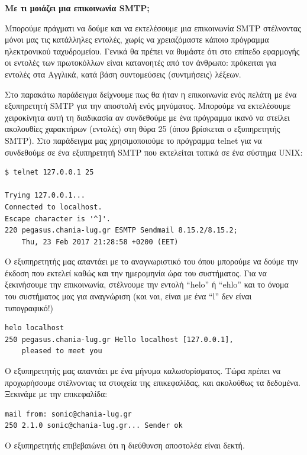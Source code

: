 \begin{inthebox}
\textbf{Με τι μοιάζει μια επικοινωνία SMTP;}

Μπορούμε πράγματι να δούμε και να εκτελέσουμε μια επικοινωνία SMTP στέλνοντας μόνοι μας τις κατάλληλες εντολές, χωρίς να χρειαζόμαστε κάποιο πρόγραμμα ηλεκτρονικού ταχυδρομείου. Γενικά θα πρέπει να θυμάστε ότι στο επίπεδο εφαρμογής οι εντολές των πρωτοκόλλων είναι κατανοητές από τον άνθρωπο: πρόκειται για εντολές στα Αγγλικά, κατά βάση συντομεύσεις (συντμήσεις) λέξεων.

Στο παρακάτω παράδειγμα δείχνουμε πως θα ήταν η επικοινωνία ενός πελάτη με ένα εξυπηρετητή SMTP για την αποστολή ενός μηνύματος. Μπορούμε να εκτελέσουμε χειροκίνητα αυτή τη διαδικασία αν συνδεθούμε με ένα πρόγραμμα ικανό να στείλει ακολουθίες χαρακτήρων (εντολές) στη θύρα 25 (όπου βρίσκεται ο εξυπηρετητής SMTP). Στο παράδειγμα μας χρησιμοποιούμε το πρόγραμμα telnet για να συνδεθούμε σε ένα εξυπηρετητή SMTP που εκτελείται τοπικά σε ένα σύστημα UNIX:

\begin{verbatim}
$ telnet 127.0.0.1 25

Trying 127.0.0.1...
Connected to localhost.
Escape character is '^]'.
220 pegasus.chania-lug.gr ESMTP Sendmail 8.15.2/8.15.2; 
    Thu, 23 Feb 2017 21:28:58 +0200 (EET)
\end{verbatim}

Ο εξυπηρετητής μας απαντάει με το αναγνωριστικό του όπου μπορούμε να δούμε την έκδοση που εκτελεί καθώς και την ημερομηνία ώρα του συστήματος. Για να ξεκινήσουμε την επικοινωνία, στέλνουμε την εντολή ``helo'' ή ``ehlo'' και το όνομα του συστήματος μας για αναγνώριση (και ναι, είναι με ένα ``l'' δεν είναι τυπογραφικό!)

\begin{verbatim}
helo localhost
250 pegasus.chania-lug.gr Hello localhost [127.0.0.1],
    pleased to meet you
\end{verbatim}

Ο εξυπηρετητής μας απαντάει με ένα μήνυμα καλωσορίσματος. Τώρα πρέπει να προχωρήσουμε στέλνοντας τα στοιχεία της επικεφαλίδας, και ακολούθως τα δεδομένα. Ξεκινάμε με την επικεφαλίδα:

\begin{verbatim}
mail from: sonic@chania-lug.gr
250 2.1.0 sonic@chania-lug.gr... Sender ok
\end{verbatim}

Ο εξυπηρετητής επιβεβαιώνει ότι η διεύθυνση αποστολέα είναι δεκτή.


\end{inthebox}
